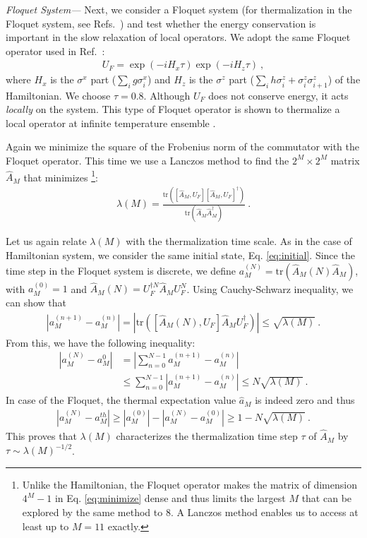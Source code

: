 \documentclass[twocolumn,superscriptaddress, prb]{revtex4-1}
\begin{document}
{\it Floquet System---}
Next, we consider a Floquet system (for thermalization in the Floquet system, see Refs.~) and test whether the energy conservation is important in the slow relaxation of local operators.
We adopt the same Floquet operator used in Ref.~:
\begin{align}
U_F = \exp(-i H_x \tau) \exp(-i H_z \tau) ~,
\label{eq:floquet_op}
\end{align}
where $H_x$ is the $\sigma^x$ part ($\sum_i g \sigma^x_i$) and $H_z$ is the $\sigma^z$ part ($\sum_i h \sigma^z_i +\sigma^z_i \sigma^z_{i+1}$)
of the Hamiltonian. We choose $\tau = 0.8$.
Although $U_F$ does not conserve energy, it acts {\it locally} on the system.
This type of Floquet operator is shown to thermalize a local operator at infinite temperature ensemble \cite{Kim_ETH,Prosen:2002}.

Again we minimize the square of the Frobenius norm of the commutator with the Floquet operator.
This time we use a Lanczos method to find the $2^M \times 2^M$ matrix $\hat{A}_M$
that minimizes \footnote{Unlike the Hamiltonian, the Floquet operator makes the matrix of dimension $4^M-1$ in Eq. \eqref{eq:minimize} dense and thus
limits the largest $M$ that can be explored by the same method to 8. A Lanczos method enables us to access at least up to $M = 11$ exactly.}:
\begin{align}\label{eq:floquet_minimize}
\lambda(M) = \frac{\mathrm{tr}([\hat{A}_M,U_F][\hat{A}_M,U_F]^\dag)}{\mathrm{tr}(\hat{A}_M\hat{A}_M^\dag)} ~.
\end{align}

Let us again relate $\lambda(M)$ with the thermalization time scale.
As in the case of Hamiltonian system, we consider the same initial state, Eq. \eqref{eq:initial}.
Since the time step in the Floquet system is discrete, we define $a_M^{(N)} = \mathrm{tr}(\hat{A}_M(N)\hat{A}_M )$, with
$a_M^{(0)} = 1$ and $\hat{A}_M(N) = U_F^{\dag N}\hat{A}_M U_F^N$. Using Cauchy-Schwarz inequality, we can show that
\begin{align}
|a_M^{(n+1)} - a_M^{(n)}| = |\mathrm{tr}([\hat{A}_M(N),U_F]\hat{A}_M U_F^{\dag})| \leq \sqrt{\lambda(M)} ~.
\end{align}
From this, we have the following inequality:
\begin{align}
|a_M^{(N)} - a_M^{0}| &= \left|\sum_{n=0}^{N-1}a_M^{(n+1)} - a_M^{(n)}\right| \nonumber\\
&\leq \sum_{n = 0}^{N-1}|a_M^{(n+1)} - a_M^{(n)}| \leq N \sqrt{\lambda(M)} ~.
\end{align}
In case of the Floquet, the thermal expectation value $\hat{a}_M$ is indeed zero and thus
\begin{align}
|a_M^{(N)} - a_M^{th}| \geq |a_M^{(0)}| - |a_M^{(N)} - a_M^{(0)}| \geq 1 - N \sqrt{\lambda(M)} ~.
\label{eq:floquet_timescale}
\end{align}
This proves that $\lambda(M)$ characterizes the thermalization time step $\tau$ of $\hat{A}_M$ by
$\tau \sim \lambda(M)^{-1/2}$.
\end{document}
